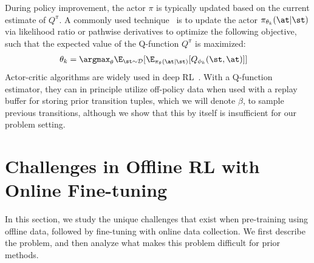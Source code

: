 During policy improvement, the actor $\pi$ is typically updated based on the current estimate of $Q^\pi$. A commonly used technique~\citep{lillicrap2015continuous, fujimoto2018td3, haarnoja2018sac} is to update the actor $\pi_{\theta_k}(\at|\st)$ via likelihood ratio or pathwise derivatives to optimize the following objective, such that the expected value of the Q-function $Q^\pi$ is maximized:
\begin{align} \label{eqn:policy_improvement}
    \theta_k & = \argmax_{\theta} \E_{\st \sim \mathcal{D}}[\E_{\pi_\theta(\at|\st)}[Q_{\phi_k}(\st,\at)]]
\end{align}
Actor-critic algorithms are widely used in deep RL~\citep{mnih2016asynchronous, lillicrap2015continuous, haarnoja2018sac, fujimoto2018td3}. With a Q-function estimator, they can in principle utilize off-policy data when used with a replay buffer for storing prior transition tuples, which we will denote $\beta$, to sample previous transitions, although we show that this by itself is insufficient for our problem setting. 

\section{Challenges in Offline RL with Online Fine-tuning}
\label{sec:challenges}

In this section, we study the unique challenges that exist when pre-training using offline data, followed by fine-tuning with online data collection. We first describe the problem, and then analyze what makes this problem difficult for prior methods.

